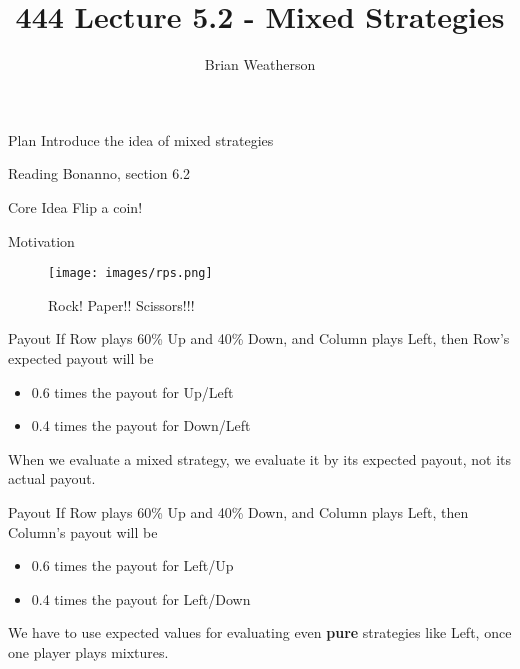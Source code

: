 \documentclass[
  ignorenonframetext,
]{beamer}
\title{444 Lecture 5.2 - Mixed Strategies}
\author{Brian Weatherson}
\date{}
\providecommand{\tightlist}{%
  \setlength{\itemsep}{0pt}\setlength{\parskip}{0pt}}
\begin{document}
\frame{\titlepage}

\begin{frame}{Plan}
\protect\hypertarget{plan}{}
Introduce the idea of mixed strategies
\end{frame}

\begin{frame}{Reading}
\protect\hypertarget{reading}{}
Bonanno, section 6.2
\end{frame}

\begin{frame}{Core Idea}
\protect\hypertarget{core-idea}{}
Flip a coin!
\end{frame}

\begin{frame}{Motivation}
\protect\hypertarget{motivation}{}
\begin{figure}
\centering
\texttt{[image: images/rps.png]}
\caption{Rock! Paper!! Scissors!!!}
\end{figure}
\end{frame}

\begin{frame}{Payout}
\protect\hypertarget{payout}{}
If Row plays 60\% Up and 40\% Down, and Column plays Left, then Row's
expected payout will be

\begin{itemize}
\tightlist
\item
  0.6 times the payout for Up/Left
\item
  0.4 times the payout for Down/Left \pause
\end{itemize}

When we evaluate a mixed strategy, we evaluate it by its expected
payout, not its actual payout.
\end{frame}

\begin{frame}{Payout}
\protect\hypertarget{payout-1}{}
If Row plays 60\% Up and 40\% Down, and Column plays Left, then Column's
payout will be

\begin{itemize}
\tightlist
\item
  0.6 times the payout for Left/Up
\item
  0.4 times the payout for Left/Down \pause
\end{itemize}

We have to use expected values for evaluating even \textbf{pure}
strategies like Left, once one player plays mixtures.
\end{frame}
\end{document}
